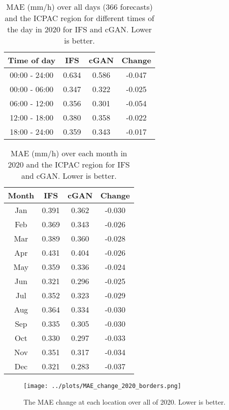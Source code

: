 \documentclass[12pt]{article}
\begin{document}

\begin{table}
\centering
\begin{tabular}{|c|c|c|c|}
\hline
Time of day & IFS & cGAN & Change \\
\hline
00:00 - 24:00 & 0.634 & 0.586 & -0.047 \\
\hline
00:00 - 06:00 & 0.347 & 0.322 & -0.025 \\
06:00 - 12:00 & 0.356 & 0.301 & -0.054 \\
12:00 - 18:00 & 0.380 & 0.358 & -0.022 \\
18:00 - 24:00 & 0.359 & 0.343 & -0.017 \\
\hline
\end{tabular}
\caption{MAE (mm/h) over all days (366 forecasts) and the ICPAC region for different times of the day in 2020 for IFS and cGAN. Lower is better.}
\end{table}

\begin{table}
\centering
\begin{tabular}{|c|c|c|c|}
\hline
Month & IFS & cGAN & Change \\
\hline
Jan & 0.391 & 0.362 & -0.030 \\
Feb & 0.369 & 0.343 & -0.026 \\
Mar & 0.389 & 0.360 & -0.028 \\
Apr & 0.431 & 0.404 & -0.026 \\
May & 0.359 & 0.336 & -0.024 \\
Jun & 0.321 & 0.296 & -0.025 \\
Jul & 0.352 & 0.323 & -0.029 \\
Aug & 0.364 & 0.334 & -0.030 \\
Sep & 0.335 & 0.305 & -0.030 \\
Oct & 0.330 & 0.297 & -0.033 \\
Nov & 0.351 & 0.317 & -0.034 \\
Dec & 0.321 & 0.283 & -0.037 \\
\hline
\end{tabular}
\caption{MAE (mm/h) over each month in 2020 and the ICPAC region for IFS and cGAN. Lower is better.}
\end{table}

\begin{figure}
\begin{center}
\texttt{[image: ../plots/MAE\_change\_2020\_borders.png]}
\end{center}
\caption{The MAE change at each location over all of 2020. Lower is better.}
\end{figure}
\end{document}
